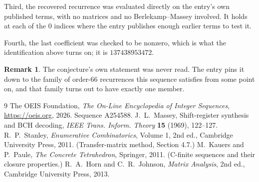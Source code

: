 \documentclass[11pt,a4paper]{article}
\theoremstyle{plain}
\theoremstyle{definition}
\newtheorem{remark}[theorem]{Remark}
\begin{document}
Third, the recovered recurrence was evaluated directly on the entry's own published terms, with
no matrices and no Berlekamp--Massey involved. It holds at each of the $0$ indices where
the entry publishes enough earlier terms to test it.

Fourth, the last coefficient was checked to be nonzero, which is what the identification above
turns on; it is $137438953472$.

\begin{remark}
The conjecture's own statement was never read. The entry pins it down to the family of
order-$66$ recurrences this sequence satisfies from some point on, and that family turns
out to have exactly one member.
\end{remark}

\begin{thebibliography}{9}
 The OEIS Foundation, \emph{The On-Line Encyclopedia of Integer
Sequences}, \url{https://oeis.org}, 2026. Sequence A254588.
 J.~L.~Massey, Shift-register synthesis and BCH decoding, \emph{IEEE
Trans. Inform. Theory} \textbf{15} (1969), 122--127.
 R.~P.~Stanley, \emph{Enumerative Combinatorics}, Volume 1, 2nd ed.,
Cambridge University Press, 2011. (Transfer-matrix method, Section 4.7.)
 M.~Kauers and P.~Paule, \emph{The Concrete Tetrahedron}, Springer, 2011.
(C-finite sequences and their closure properties.)
 R.~A.~Horn and C.~R.~Johnson, \emph{Matrix Analysis}, 2nd ed., Cambridge
University Press, 2013.
\end{thebibliography}
\end{document}
